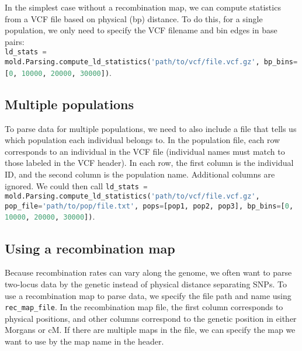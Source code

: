 \documentclass[11pt]{article}
\makeatletter
\newcommand{\py}[1]{\lstinline[breaklines=true,language=Python, showstringspaces=False]@#1@}
\makeatother
\begin{document}
In the simplest case without a recombination map, we can compute statistics from a VCF file based on physical (bp) distance.
To do this, for a single population, we only need to specify the VCF filename and bin edges in base pairs:\\
\py{ld_stats = mold.Parsing.compute_ld_statistics('path/to/vcf/file.vcf.gz', bp_bins=[0, 10000, 20000, 30000])}.

\subsection{Multiple populations}

To parse data for multiple populations, we need to also include a file that tells us which population each individual belongs to.
In the population file, each row corresponds to an individual in the VCF file (individual names must match to those labeled in the VCF header).
In each row, the first column is the individual ID, and the second column is the population name.
Additional columns are ignored.
We could then call \py{ld_stats = mold.Parsing.compute_ld_statistics('path/to/vcf/file.vcf.gz', pop_file='path/to/pop/file.txt', pops=[pop1, pop2, pop3], bp_bins=[0, 10000, 20000, 30000])}.

\subsection{Using a recombination map}

Because recombination rates can vary along the genome, we often want to parse two-locus data by the genetic instead of physical distance separating SNPs.
To use a recombination map to parse data, we specify the file path and name using \py{rec_map_file}.
In the recombination map file, the first column corresponds to physical positions, and other columns correspond to the genetic position in either Morgans or cM.
If there are multiple maps in the file, we can specify the map we want to use by the map name in the header.
\end{document}

